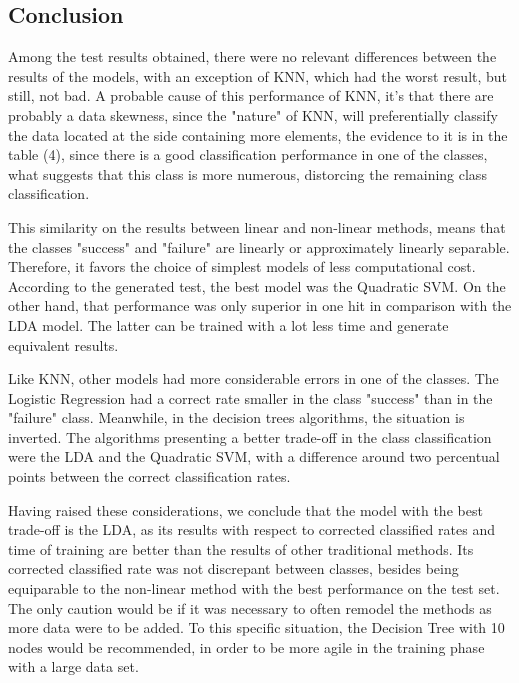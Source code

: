 
\subsection{Conclusion}

Among the test results obtained, there were no relevant differences between the results 
of the models, with an exception of KNN, which had the worst result, but still, not bad. 
A probable cause of this performance of KNN, it's that there are probably a data skewness, 
since the "nature" of KNN, will preferentially classify the data located at the side 
containing more elements, the evidence to it is in the table (4), since there is a 
good classification performance in one of the classes, what suggests that this class 
is more numerous, distorcing the remaining class classification.

This similarity on the results between linear and non-linear methods, means that 
the classes "success" and "failure" are linearly or approximately linearly separable. 
Therefore, it favors the choice of simplest models of less computational cost. 
According to the generated test, the best model was the Quadratic SVM. On the other hand,
that performance was only superior in one hit in comparison with the LDA model. The latter
can be trained with a lot less time and generate equivalent results. 

Like KNN, other models had more considerable errors in one of the classes. The Logistic
Regression had a correct rate smaller in the class "success" than in the "failure" class.
Meanwhile, in the decision trees algorithms, the situation is inverted.  The algorithms 
presenting a better trade-off in the class classification were the LDA and the 
Quadratic SVM, with a difference around two percentual points between the correct 
classification rates.

Having raised these considerations, we conclude that the model with the best
trade-off is the LDA, as its results with respect to corrected classified rates and 
time of training are better than the results of other traditional methods. Its 
corrected classified rate was not discrepant between classes, besides being equiparable 
to the non-linear method with the best performance on the test set. The only caution would 
be if it was necessary to often remodel the methods as more data were to be added.
To this specific situation, the Decision Tree with 10 nodes would be recommended, in order to be 
more agile in the training phase with a large data set. 